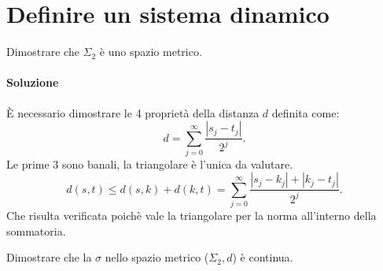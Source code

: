 \section{Definire un sistema dinamico}%
\label{sub:Definire un sistema dinamico}
\begin{ex}
    Dimostrare che $\Sigma_2$ è uno spazio metrico.
\end{ex}
\paragraph{Soluzione}%
È necessario dimostrare le 4 proprietà della distanza $d$ definita come:
\[
    d = \sum_{j=0}^{\infty} \frac{\left|s_j-t_j\right|}{2^j}
.\] 
Le prime 3 sono banali, la triangolare è l'unica da valutare.
\[
    d(s, t) \le d(s, k) + d(k, t) = \sum_{j=0}^{\infty} \frac{\left|s_j-k_j\right| + \left|k_j-t_j\right|}{2^j} 
.\] 
Che risulta verificata poichè vale la triangolare per la norma all'interno della sommatoria.
\begin{ex}
    Dimostrare che la $\sigma$ nello spazio metrico ($\Sigma_2, d$) è continua.
\end{ex}
\noindent
